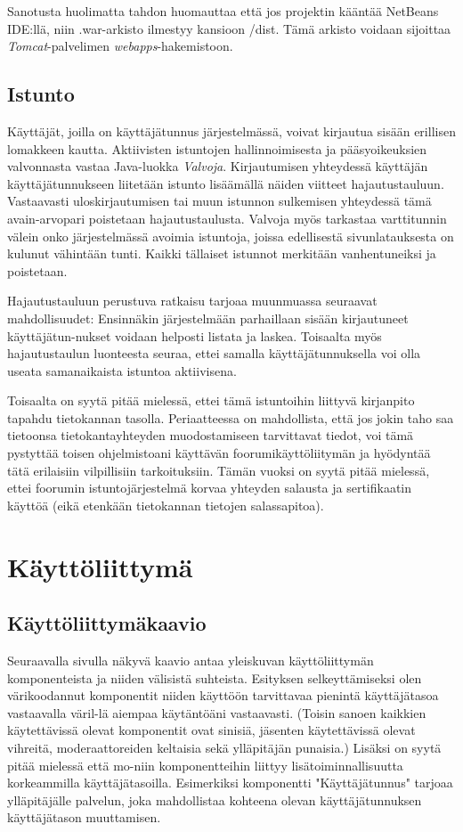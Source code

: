 \documentclass[11pt]{article}
\begin{document}
			Sanotusta huolimatta tahdon huomauttaa että jos projektin 
			kääntää NetBeans IDE:llä, niin .war-arkisto ilmestyy kansioon /dist. Tämä arkisto voidaan
			sijoittaa \emph{Tomcat}-palvelimen \emph{webapps}-hakemistoon.
			
		\newpage
		\thispagestyle{plain}
		\subsection{Istunto}
			Käyttäjät, joilla on käyttäjätunnus järjestelmässä, voivat kirjautua sisään erillisen lomakkeen
			kautta. Aktiivisten istuntojen hallinnoimisesta ja pääsyoikeuksien valvonnasta vastaa Java-luokka
			\emph{Valvoja}. Kirjautumisen yhteydessä käyttäjän käyttäjätunnukseen liitetään istunto lisäämällä
			näiden viitteet hajautustauluun. Vastaavasti uloskirjautumisen tai muun istunnon sulkemisen
			yhteydessä tämä avain-arvopari poistetaan hajautustaulusta. Valvoja myös tarkastaa varttitunnin
			välein onko järjestelmässä avoimia istuntoja, joissa edellisestä sivunlatauksesta on kulunut
			vähintään tunti. Kaikki tällaiset istunnot merkitään vanhentuneiksi ja poistetaan.
			
			Hajautustauluun perustuva ratkaisu tarjoaa muunmuassa seuraavat mahdollisuudet: Ensinnäkin
			järjestelmään parhaillaan sisään kirjautuneet käyttäjätun-nukset voidaan helposti listata ja laskea.
			Toisaalta myös hajautustaulun luonteesta seuraa, ettei samalla käyttäjätunnuksella voi olla useata
			samanaikaista istuntoa aktiivisena.
			
			Toisaalta on syytä pitää mielessä, ettei tämä istuntoihin liittyvä kirjanpito tapahdu tietokannan
			tasolla. Periaatteessa on mahdollista, että jos jokin taho saa tietoonsa tietokantayhteyden 
			muodostamiseen tarvittavat tiedot, voi tämä pystyttää toisen ohjelmistoani käyttävän
			foorumikäyttöliitymän ja hyödyntää tätä erilaisiin vilpillisiin tarkoituksiin. Tämän vuoksi
			on syytä pitää mielessä, ettei foorumin istuntojärjestelmä korvaa yhteyden salausta ja sertifikaatin
			käyttöä (eikä etenkään tietokannan tietojen salassapitoa).
	
\newpage
\thispagestyle{plain}
	\section{Käyttöliittymä}
		\subsection{Käyttöliittymäkaavio}
			Seuraavalla sivulla näkyvä kaavio antaa yleiskuvan käyttöliittymän komponenteista ja niiden
			välisistä suhteista. Esityksen selkeyttämiseksi olen värikoodannut komponentit niiden käyttöön
			tarvittavaa pienintä käyttäjätasoa vastaavalla väril-lä aiempaa käytäntöäni vastaavasti.
			(Toisin sanoen kaikkien käytettävissä olevat komponentit ovat sinisiä, jäsenten käytettävissä
			olevat vihreitä, moderaattoreiden keltaisia sekä ylläpitäjän punaisia.) Lisäksi on syytä pitää
			mielessä että mo-niin komponentteihin liittyy lisätoiminnallisuutta korkeammilla käyttäjätasoilla. 
			Esimerkiksi komponentti "Käyttäjätunnus" tarjoaa ylläpitäjälle palvelun, joka mahdollistaa kohteena 
			olevan käyttäjätunnuksen käyttäjätason muuttamisen.
		
\end{document}
